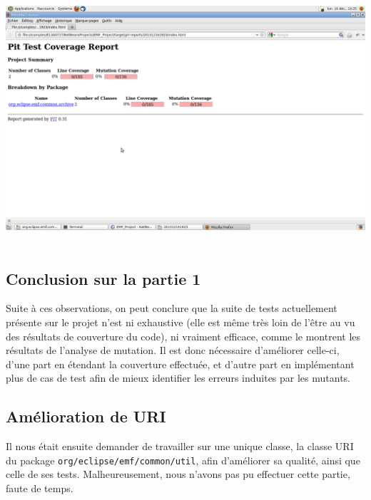 \documentclass[a4paper]{article}
\begin{document}
		\begin{center}
			\includegraphics[width=1.0\textwidth]{CapturePit.png}~\\
		\end{center}

		\subsection{Conclusion sur la partie 1}

		Suite à ces observations, on peut conclure que la suite de tests actuellement présente sur le projet n'est ni exhaustive (elle est même très loin de l'être au vu des résultats de couverture du code), ni vraiment efficace, comme le montrent les résultats de l'analyse de mutation. Il est donc nécessaire d'améliorer celle-ci, d'une part en étendant la couverture effectuée, et d'autre part en implémentant plus de cas de test afin de mieux identifier les erreurs induites par les mutants.

	\newpage

	\begin{center}
		\section{Amélioration de URI}
	\end{center}

	\vspace{0.5cm}

	Il nous était ensuite demander de travailler sur une unique classe, la classe URI du package \texttt{org/eclipse/emf/common/util}, afin d'améliorer sa qualité, ainsi que celle de ses tests. Malheureusement, nous n'avons pas pu effectuer cette partie, faute de temps.
\end{document}
